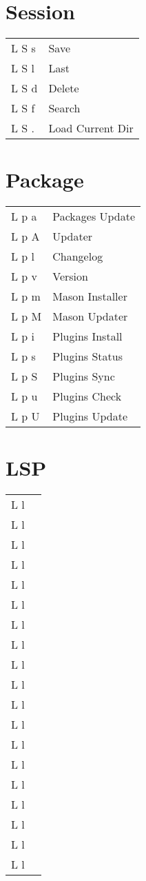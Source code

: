 \documentclass[
  ,landscape
  ,columns=4
]{cheatsheet}
\begin{document}
\section{Session}

\begin{tabular}{ll}
	L S s & Save             \\
	L S l & Last             \\
	L S d & Delete           \\
	L S f & Search           \\
	L S . & Load Current Dir \\
\end{tabular}

\section{Package}

\begin{tabular}{ll}
	L p a & Packages Update \\
	L p A & Updater         \\
	L p l & Changelog       \\
	L p v & Version         \\
	L p m & Mason Installer \\
	L p M & Mason Updater   \\
	L p i & Plugins Install \\
	L p s & Plugins Status  \\
	L p S & Plugins Sync    \\
	L p u & Plugins Check   \\
	L p U & Plugins Update  \\
\end{tabular}

\section{LSP}

\begin{tabular}{ll}
	L l & \\
	L l & \\
	L l & \\
	L l & \\
	L l & \\
	L l & \\
	L l & \\
	L l & \\
	L l & \\
	L l & \\
	L l & \\
	L l & \\
	L l & \\
	L l & \\
	L l & \\
	L l & \\
	L l & \\
	L l & \\
	L l & \\
\end{tabular}
\end{document}
